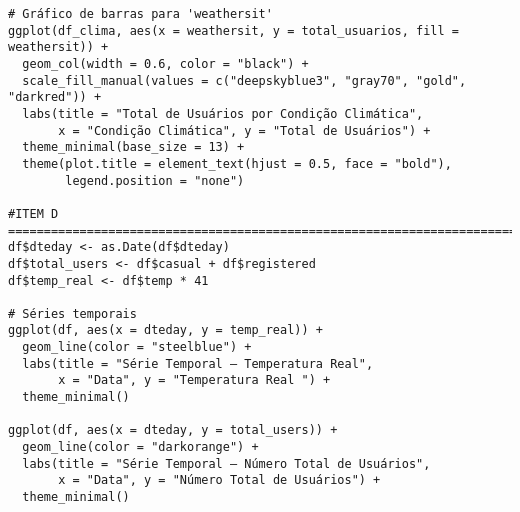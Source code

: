 \documentclass[a4paper,11pt]{article}
\begin{document}
\begin{lstlisting}
# Gráfico de barras para 'weathersit'
ggplot(df_clima, aes(x = weathersit, y = total_usuarios, fill = weathersit)) +
  geom_col(width = 0.6, color = "black") +
  scale_fill_manual(values = c("deepskyblue3", "gray70", "gold", "darkred")) +
  labs(title = "Total de Usuários por Condição Climática",
       x = "Condição Climática", y = "Total de Usuários") +
  theme_minimal(base_size = 13) +
  theme(plot.title = element_text(hjust = 0.5, face = "bold"),
        legend.position = "none")

#ITEM D =======================================================================================
df$dteday <- as.Date(df$dteday)
df$total_users <- df$casual + df$registered
df$temp_real <- df$temp * 41

# Séries temporais
ggplot(df, aes(x = dteday, y = temp_real)) +
  geom_line(color = "steelblue") +
  labs(title = "Série Temporal — Temperatura Real",
       x = "Data", y = "Temperatura Real ") +
  theme_minimal()

ggplot(df, aes(x = dteday, y = total_users)) +
  geom_line(color = "darkorange") +
  labs(title = "Série Temporal — Número Total de Usuários",
       x = "Data", y = "Número Total de Usuários") +
  theme_minimal()
\end{lstlisting}
\end{document}
